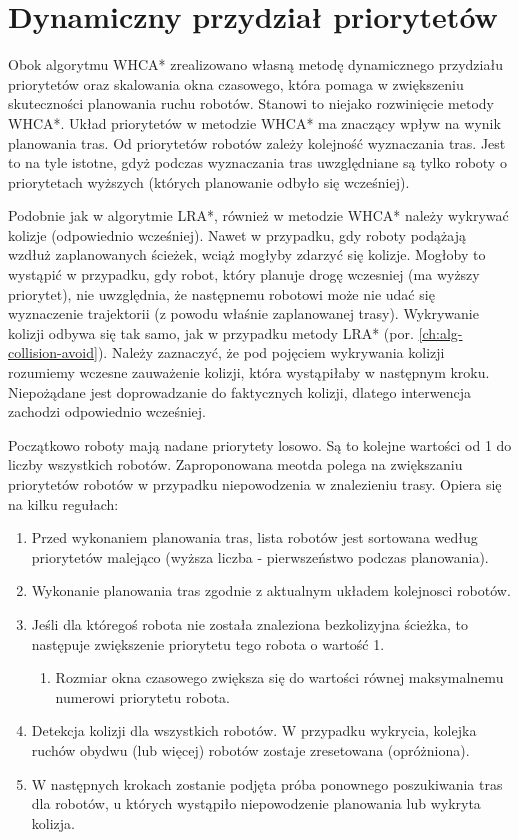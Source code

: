 \section{Dynamiczny przydział priorytetów}
\label{ch:alg-priorities-allocation}
Obok algorytmu WHCA* zrealizowano własną metodę dynamicznego przydziału priorytetów oraz skalowania okna czasowego, która pomaga w zwiększeniu skuteczności planowania ruchu robotów. Stanowi to niejako rozwinięcie metody WHCA*.
Układ priorytetów w metodzie WHCA* ma znaczący wpływ na wynik planowania tras. Od priorytetów robotów zależy kolejność wyznaczania tras.
Jest to na tyle istotne, gdyż podczas wyznaczania tras uwzględniane są tylko roboty o priorytetach wyższych (których planowanie odbyło się wcześniej).

Podobnie jak w algorytmie LRA*, również w metodzie WHCA* należy wykrywać kolizje (odpowiednio wcześniej).
Nawet w przypadku, gdy roboty podążają wzdłuż zaplanowanych ścieżek, wciąż mogłyby zdarzyć się kolizje.
Mogłoby to wystąpić w przypadku, gdy robot, który planuje drogę wczesniej (ma wyższy priorytet), nie uwzględnia, że następnemu robotowi może nie udać się wyznaczenie trajektorii (z powodu właśnie zaplanowanej trasy).
Wykrywanie kolizji odbywa się tak samo, jak w przypadku metody LRA* (por. \ref{ch:alg-collision-avoid}).
Należy zaznaczyć, że pod pojęciem wykrywania kolizji rozumiemy wczesne zauważenie kolizji, która wystąpiłaby w następnym kroku. Niepożądane jest doprowadzanie do faktycznych kolizji, dlatego interwencja zachodzi odpowiednio wcześniej.



Początkowo roboty mają nadane priorytety losowo. Są to kolejne wartości od 1 do liczby wszystkich robotów.
Zaproponowana meotda polega na zwiększaniu priorytetów robotów w przypadku niepowodzenia w znalezieniu trasy.
Opiera się na kilku regułach:
\begin{enumerate}
	\item Przed wykonaniem planowania tras, lista robotów jest sortowana według priorytetów malejąco (wyższa liczba - pierwszeństwo podczas planowania).
	\item Wykonanie planowania tras zgodnie z aktualnym układem kolejnosci robotów.
	\item Jeśli dla któregoś robota nie została znaleziona bezkolizyjna ścieżka, to następuje zwiększenie priorytetu tego robota o wartość 1.
	\begin{enumerate}
		\item Rozmiar okna czasowego zwiększa się do wartości równej maksymalnemu numerowi priorytetu robota.
	\end{enumerate}
	\item Detekcja kolizji dla wszystkich robotów. W przypadku wykrycia, kolejka ruchów obydwu (lub więcej) robotów zostaje zresetowana (opróżniona).
	\item W następnych krokach zostanie podjęta próba ponownego poszukiwania tras dla robotów, u których wystąpiło niepowodzenie planowania lub wykryta kolizja.
\end{enumerate}

